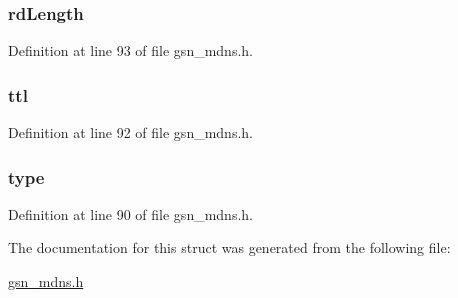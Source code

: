 \hypertarget{a00015_aceb8beab66fb702ac68fcbe4bbd16f9d}{
\subsubsection[{rdLength}]{ {\bf rdLength}}}
\label{a00015_aceb8beab66fb702ac68fcbe4bbd16f9d}


Definition at line 93 of file gsn\_\-mdns.h.

\hypertarget{a00015_af96204bb13dce2fe8a0dac78b29c40a4}{
\subsubsection[{ttl}]{ {\bf ttl}}}
\label{a00015_af96204bb13dce2fe8a0dac78b29c40a4}


Definition at line 92 of file gsn\_\-mdns.h.

\hypertarget{a00015_a3e67ac96505a8b96372877b6fc386169}{
\subsubsection[{type}]{ {\bf type}}}
\label{a00015_a3e67ac96505a8b96372877b6fc386169}


Definition at line 90 of file gsn\_\-mdns.h.



The documentation for this struct was generated from the following file:\begin{DoxyCompactItemize}
\item 
\hyperlink{a00526}{gsn\_\-mdns.h}\end{DoxyCompactItemize}
